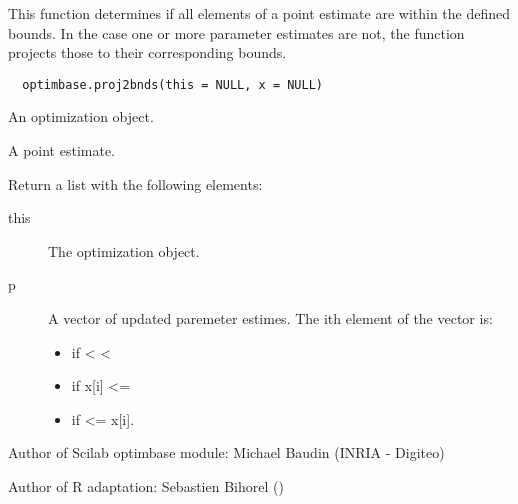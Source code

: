 %
\begin{Description}\relax
This function determines if all elements of a point estimate are within the
defined bounds. In the case one or more parameter estimates are not, the
function projects those to their corresponding bounds.
\end{Description}
%
\begin{Usage}
\begin{verbatim}
  optimbase.proj2bnds(this = NULL, x = NULL)
\end{verbatim}
\end{Usage}
%
\begin{Arguments}
\begin{ldescription}
\item[\code{this}] An optimization object.
\item[\code{x}] A point estimate.
\end{ldescription}
\end{Arguments}
%
\begin{Value}
Return a list with the following elements: \begin{description}

\item[this] The optimization object.
\item[p] A vector of updated paremeter estimes. The ith element of the
vector is: \begin{itemize}

\item {} if  <  <
\item {} if x[i] <= 
\item {} if  <= x[i].

\end{itemize}



\end{description}

\end{Value}
%
\begin{Author}\relax
Author of Scilab optimbase module: Michael Baudin (INRIA - Digiteo)

Author of R adaptation: Sebastien Bihorel ()
\end{Author}
